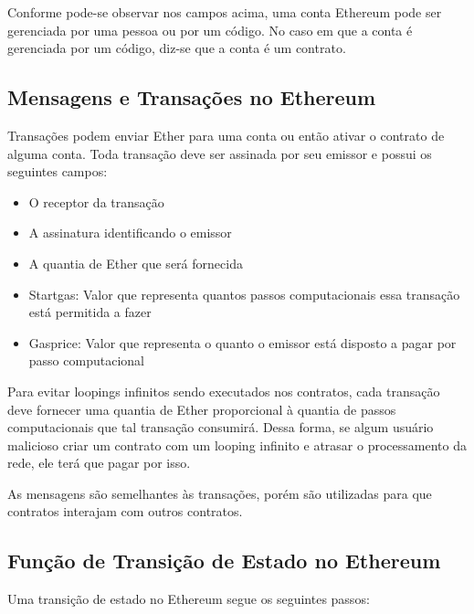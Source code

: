 Conforme pode-se observar nos campos acima, uma conta Ethereum pode ser gerenciada por uma pessoa ou por um código. No caso em que a conta é gerenciada por um código, diz-se que a conta é um contrato.

\subsection{Mensagens e Transações no Ethereum}

Transações podem enviar Ether para uma conta ou então ativar o contrato de alguma conta. Toda transação deve ser assinada por seu emissor e possui os seguintes campos:

\begin{itemize}
\item O receptor da transação
\item A assinatura identificando o emissor
\item A quantia de Ether que será fornecida
\item Startgas: Valor que representa quantos passos computacionais essa transação está permitida a fazer
\item Gasprice: Valor que representa o quanto o emissor está disposto a pagar por passo computacional
\end{itemize}

Para evitar loopings infinitos sendo executados nos contratos, cada transação deve fornecer uma quantia de Ether proporcional à quantia de passos computacionais que tal transação consumirá. Dessa forma, se algum usuário malicioso criar um contrato com um looping infinito e atrasar o processamento da rede, ele terá que pagar por isso.

As mensagens são semelhantes às transações, porém são utilizadas para que contratos interajam com outros contratos.

\subsection{Função de Transição de Estado no Ethereum}

Uma transição de estado no Ethereum segue os seguintes passos:

